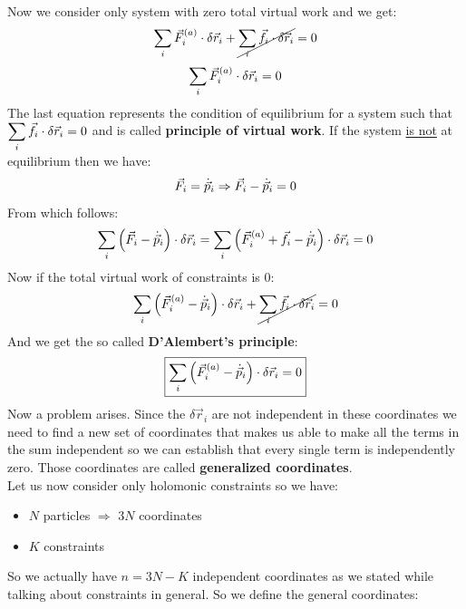 Now we consider only system with zero total virtual work and we get:
\begin{equation}
    \displaystyle\sum_i \vec{F}^{(a)}_i \cdot \delta \vec{r}_i + \cancel{\displaystyle\sum_i \vec{f}_i \cdot \delta \vec{r}_i} = 0
\end{equation}
\begin{equation}
    \displaystyle\sum_i \vec{F}^{(a)}_i \cdot \delta \vec{r}_i = 0
\end{equation}
The last equation represents the condition of equilibrium for a system such that $\displaystyle\sum_i \vec{f}_i \cdot \delta \vec{r}_i = 0$ and is called \textbf{principle of virtual work}.
If the system \underline{is not} at equilibrium then we have:
\begin{equation}
    \vec{F}_i = \dot{\vec{p}}_i \Rightarrow \vec{F}_i - \dot{\vec{p}}_i = 0
\end{equation}
From which follows:
\begin{equation}
    \displaystyle\sum_i \left(\vec{F}_i - \dot{\vec{p}}_i\right) \cdot \delta \vec{r}_i = \displaystyle\sum_i \left(\vec{F}^{(a)}_i + \vec{f}_i - \dot{\vec{p}}_i\right) \cdot \delta \vec{r}_i = 0
\end{equation}
Now if the total virtual work of constraints is 0:
\begin{equation}
    \displaystyle\sum_i \left(\vec{F}^{(a)}_i - \dot{\vec{p}}_i\right) \cdot \delta \vec{r}_i + \cancel{\displaystyle\sum_i \vec{f}_i \cdot \delta \vec{r}_i} = 0
\end{equation}
And we get the so called \textbf{D'Alembert's principle}:
\begin{equation}  \label{D'Alambert_principle}
    \boxed{\displaystyle\sum_i \left(\vec{F}^{(a)}_i - \dot{\vec{p}}_i\right) \cdot \delta \vec{r}_i = 0}
\end{equation}
Now a problem arises. Since the $\delta \vec{r}_i$ are not independent in these coordinates we need to find a new set of coordinates that makes us able to make all the terms in the sum independent so we can establish that every single term is independently zero.
Those coordinates are called \textbf{generalized coordinates}.\\
Let us now consider only holomonic constraints so we have:
\begin{itemize}
    \item $N$ particles $\Rightarrow$ $3N$ coordinates
    \item $K$ constraints
\end{itemize}
So we actually have $n = 3N-K$ independent coordinates as we stated while talking about constraints in general. So we define the general coordinates:
